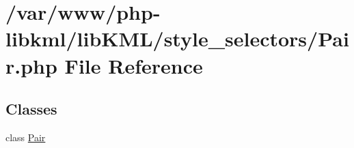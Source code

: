 \hypertarget{Pair_8php}{
\section{/var/www/php-\/libkml/libKML/style\_\-selectors/Pair.php File Reference}
\label{d0/db2/Pair_8php}
}
\subsection*{Classes}
\begin{DoxyCompactItemize}
\item 
class \hyperlink{classPair}{Pair}
\end{DoxyCompactItemize}
